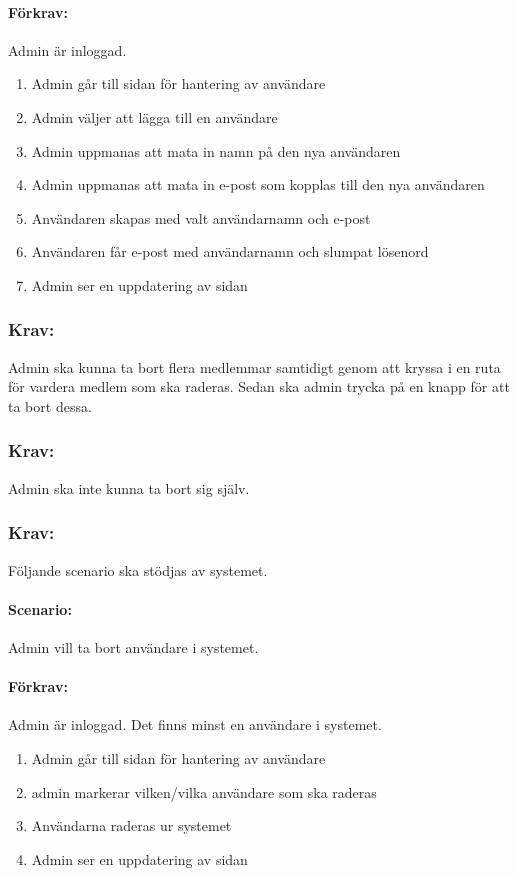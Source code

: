 \documentclass[paper=a4, fontsize=11pt,twoside]{article}
\begin{document}
\paragraph{Förkrav:}
Admin är inloggad. 
\begin{enumerate}
\item Admin går till sidan för hantering av användare
\item Admin väljer att lägga till en användare
\item Admin uppmanas att mata in namn på den nya användaren
\item Admin uppmanas att mata in e-post som kopplas till den nya användaren
\item Användaren skapas med valt användarnamn och e-post
\item Användaren får e-post med användarnamn och slumpat lösenord
\item Admin ser en uppdatering av sidan
\end{enumerate}

\subsubsection{Krav:} Admin ska kunna ta bort flera medlemmar samtidigt genom att kryssa i en ruta för vardera medlem som ska raderas. Sedan ska admin trycka på en knapp för att ta bort dessa.

\subsubsection{Krav:} Admin ska inte kunna ta bort sig själv.

\subsubsection{Krav:} Följande scenario ska stödjas av systemet. 
\paragraph{Scenario:}
Admin vill ta bort användare i systemet.
\paragraph{Förkrav:}
Admin är inloggad. Det finns minst en användare i systemet.
\begin{enumerate}
\item Admin går till sidan för hantering av användare
\item admin markerar vilken/vilka användare som ska raderas
\item Användarna raderas ur systemet
\item Admin ser en uppdatering av sidan
\end{enumerate}
\end{document}
